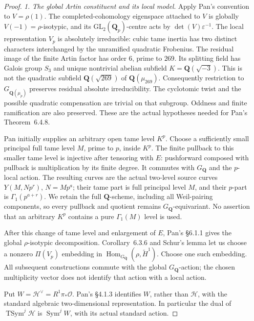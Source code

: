 \begin{proof}
\emph{1. The global Artin constituent and its local model.}
Apply Pan's convention to \(V=\rho(1)\).  The completed-cohomology
eigenspace attached to \(V\) is globally \(V(-1)=\rho\)-isotypic,
and its \(\mathrm{GL}_2(\mathbf Q_p)\)-centre acts by
\(\det(V)\varepsilon^{-1}\).  The local representation \(V_p\)
is absolutely irreducible: cubic tame inertia has two distinct
characters interchanged by the unramified quadratic Frobenius.
The residual image of the finite Artin factor has order \(6\),
prime to \(269\).  Its splitting field has Galois group \(S_3\)
and unique nontrivial abelian subfield
\(K=\mathbf Q(\sqrt{-3})\).  This is not the quadratic subfield
\(\mathbf Q(\sqrt{269})\) of \(\mathbf Q(\mu_{269})\).
Consequently restriction to \(G_{\mathbf Q(\mu_p)}\) preserves
residual absolute irreducibility.  The cyclotomic twist and the
possible quadratic compensation are trivial on that subgroup.
Oddness and finite ramification are also preserved.  These are
the actual hypotheses needed for Pan's Theorem~6.4.8.

Pan initially supplies an arbitrary open tame level \(K^p\).
Choose a sufficiently small principal full tame level \(M\),
prime to \(p\), inside \(K^p\).  The finite pullback to this
smaller tame level is injective after tensoring with \(E\):
pushforward composed with pullback is multiplication
by its finite degree.  It commutes with \(G_{\mathbf Q}\) and
the \(p\)-local action.  The resulting curves are the actual
two-level source curves \(Y(M,Np^r)\), \(N=Mp^a\); their
tame part is full principal level \(M\), and their \(p\)-part
is \(\Gamma_1(p^{a+r})\).  We retain the full
\(\mathbf Q\)-scheme, including all Weil-pairing components,
so every pullback and quotient remains \(G_{\mathbf Q}\)-equivariant.
No assertion that an arbitrary
\(K^p\) contains a pure \(\Gamma_1(M)\) level is used.

After this change of tame level and enlargement of \(E\),
Pan's \S6.1.1 gives the global \(\rho\)-isotypic
decomposition.  Corollary~6.3.6 and Schur's lemma let us
choose a nonzero \(\Pi(V_p)\) embedding in
\(\operatorname{Hom}_{G_{\mathbf Q}}(\rho,\widetilde H^1)\).
Choose one such embedding.  All subsequent constructions commute with
the global \(G_{\mathbf Q}\)-action; the chosen multiplicity vector
does not identify that action with a local action.

Put \(W=\mathcal H^\vee=R^1\pi_*\mathcal O\).
Pan's \S4.1.3 identifies \(W\), rather than \(\mathcal H\), with
the standard algebraic two-dimensional representation.  In
particular the dual of \(\operatorname{TSym}^j\mathcal H\) is
\(\operatorname{Sym}^j W\), with its actual standard action.


\end{proof}
